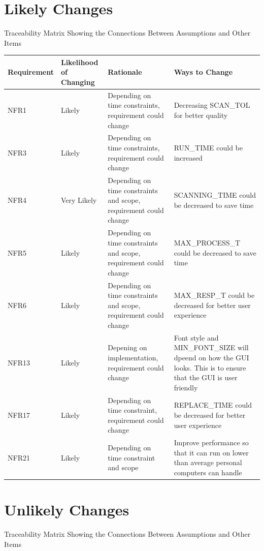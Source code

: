 \documentclass[12pt]{article}
\begin{document}
\section{Likely Changes}
\label{sec_LikelyChanges}

Traceability Matrix Showing the Connections Between Assumptions and Other Items

\begin{longtable}{ | p{2.3cm} | p{3.0cm} | p{4cm} | p{4cm} |}
\hline
Requirement & Likelihood of Changing & Rationale & Ways to Change \\
\hline
NFR1 & Likely & Depending on time constraints, requirement could change & Decreasing SCAN\_TOL for better quality \\
\hline
NFR3 & Likely & Depending on time constraints, requirement could change & RUN\_TIME could be increased \\
\hline
NFR4 & Very Likely & Depending on time constraints and scope, requirement could change & SCANNING\_TIME could be decreased to save time \\
\hline
NFR5 & Likely & Depending on time constraints and scope, requirement could change & MAX\_PROCESS\_T could be decreased to save time \\
\hline
NFR6 & Likely & Depending on time constraints and scope, requirement could change & MAX\_RESP\_T could be decreased for better user experience \\
\hline
NFR13 & Likely & Depening on implementation, requirement could change & Font style and MIN\_FONT\_SIZE will dpeend on how the GUI looks. This is to ensure that the GUI is user friendly \\
\hline
NFR17 & Likely & Depending on time constraint, requirement could change & REPLACE\_TIME could be decreased for better user experience \\
\hline
NFR21 & Likely & Depending on time constraint and scope & Improve performance so that it can run on lower than average personal computers can handle \\
\hline
\end{longtable}

\section{Unlikely Changes} 
\label{sec_UnlikelyChanges}

Traceability Matrix Showing the Connections Between Assumptions and Other Items
\end{document}
